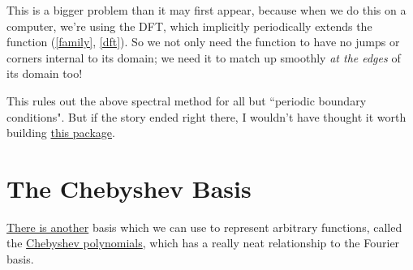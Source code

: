 \documentclass[10pt]{article}
\begin{document}
This is a bigger problem than it may first appear, because when we do this on a computer, we're using the DFT, which implicitly periodically extends the function (\autoref{family}, \autoref{dft}). So we not only need the function to have no jumps or corners internal to its domain; we need it to match up smoothly \textit{at the edges} of its domain too!

This rules out the above spectral method for all but ``periodic boundary conditions"\cite{kutz}. But if the story ended right there, I wouldn't have thought it worth building \href{https://pypi.org/project/spectral-derivatives/}{this package}.

\section{The Chebyshev Basis}

\href{https://www.youtube.com/watch?v=HloOBYPwlmU}{There is another} basis which we can use to represent arbitrary functions, called the \href{https://epubs.siam.org/doi/epdf/10.1137/1.9780898719598.ch8}{Chebyshev polynomials}\cite{trefethen8}, which has a really neat relationship to the Fourier basis.\pagebreak
\end{document}
